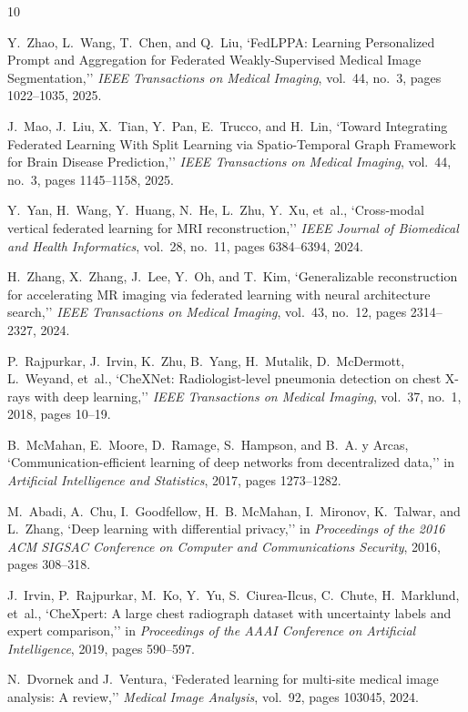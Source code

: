 \documentclass[letterpaper, conference]{IEEEtran}
\begin{document}
\begin{thebibliography}{10}

Y.~Zhao, L.~Wang, T.~Chen, and Q.~Liu,
`FedLPPA: Learning Personalized Prompt and Aggregation for Federated Weakly-Supervised Medical Image Segmentation,''
\emph{IEEE Transactions on Medical Imaging}, vol.\ 44, no.\ 3, pages 1022--1035, 2025.

J.~Mao, J.~Liu, X.~Tian, Y.~Pan, E.~Trucco, and H.~Lin,
`Toward Integrating Federated Learning With Split Learning via Spatio-Temporal Graph Framework for Brain Disease Prediction,''
\emph{IEEE Transactions on Medical Imaging}, vol.\ 44, no.\ 3, pages 1145--1158, 2025.

Y.~Yan, H.~Wang, Y.~Huang, N.~He, L.~Zhu, Y.~Xu, et~al.,
`Cross-modal vertical federated learning for MRI reconstruction,''
\emph{IEEE Journal of Biomedical and Health Informatics}, vol.\ 28, no.\ 11, pages 6384--6394, 2024.

H.~Zhang, X.~Zhang, J.~Lee, Y.~Oh, and T.~Kim,
`Generalizable reconstruction for accelerating MR imaging via federated learning with neural architecture search,''
\emph{IEEE Transactions on Medical Imaging}, vol.\ 43, no.\ 12, pages 2314--2327, 2024.

P.~Rajpurkar, J.~Irvin, K.~Zhu, B.~Yang, H.~Mutalik, D.~McDermott, L.~Weyand, et~al.,
`CheXNet: Radiologist-level pneumonia detection on chest X-rays with deep learning,''
\emph{IEEE Transactions on Medical Imaging}, vol.\ 37, no.\ 1, 2018, pages 10--19.

B.~McMahan, E.~Moore, D.~Ramage, S.~Hampson, and B.~A. y Arcas,
`Communication-efficient learning of deep networks from decentralized data,''
in \emph{Artificial Intelligence and Statistics}, 2017, pages 1273--1282.

M.~Abadi, A.~Chu, I.~Goodfellow, H.~B. McMahan, I.~Mironov, K.~Talwar, and L.~Zhang,
`Deep learning with differential privacy,''
in \emph{Proceedings of the 2016 ACM SIGSAC Conference on Computer and Communications Security}, 2016, pages 308--318.

J.~Irvin, P.~Rajpurkar, M.~Ko, Y.~Yu, S.~Ciurea-Ilcus, C.~Chute, H.~Marklund, et~al.,
`CheXpert: A large chest radiograph dataset with uncertainty labels and expert comparison,''
in \emph{Proceedings of the AAAI Conference on Artificial Intelligence}, 2019, pages 590--597.

N.~Dvornek and J.~Ventura,
`Federated learning for multi-site medical image analysis: A review,''
\emph{Medical Image Analysis}, vol.\ 92, pages 103045, 2024.


\end{thebibliography}
\end{document}

